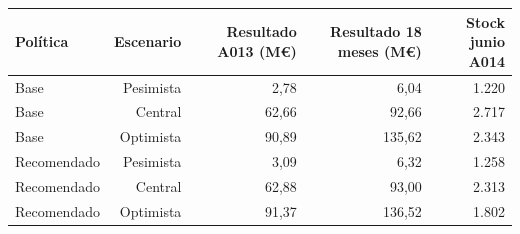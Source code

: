 \begin{tabular}{lrrrr}
\toprule
Política & Escenario & Resultado A013 (M€) & Resultado 18 meses (M€) & Stock junio A014 \\
\midrule
Base & Pesimista & 2,78 & 6,04 & 1.220 \\
Base & Central & 62,66 & 92,66 & 2.717 \\
Base & Optimista & 90,89 & 135,62 & 2.343 \\
Recomendado & Pesimista & 3,09 & 6,32 & 1.258 \\
Recomendado & Central & 62,88 & 93,00 & 2.313 \\
Recomendado & Optimista & 91,37 & 136,52 & 1.802 \\
\bottomrule
\end{tabular}

